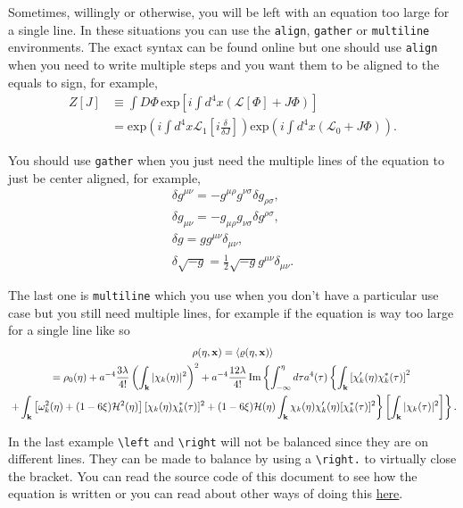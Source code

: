 Sometimes, willingly or otherwise, you will be left with an equation too large for a single line. In these situations you can use the \verb*|align|, \verb*|gather| or \verb*|multiline| environments. The exact syntax can be found online but one should use \verb*|align| when you need to write multiple steps and you want them to be aligned to the equals to sign, for example,
\begin{align}
	Z[J] &\equiv \int{D\Phi \, \text{exp}\left[i \int{d^4 x}(\mathscr{L}[\Phi]+J\Phi)\right]} \nonumber \\
	&= \text{exp}\left(i \int{d^4x}\mathscr{L}_1\left[i \frac{\delta}{\delta J}\right]\right) \text{exp}\left(i \int{d^4x }(\mathscr{L}_0 +J\Phi) \right) .\label{eq:Z}
\end{align}

You should use \verb*|gather| when you just need the multiple lines of the equation to just be center aligned, for example,
\begin{gather}
	\delta g^{\mu\nu} = - g^{\mu \rho}g^{\nu \sigma} \delta g_{\rho \sigma}, \\
	\delta g_{\mu\nu} = - g_{\mu \rho}g_{\nu \sigma} \delta g^{\rho \sigma}, \\
	\delta g  = g g^{\mu\nu} \delta_{\mu\nu}, \\
	\delta \sqrt{-g}  = \frac{1}{2}\sqrt{-g} g^{\mu\nu} \delta_{\mu\nu}. \label{eq:var-detg}
\end{gather}

The last one is \verb*|multiline| which you use when you don't have a particular use case but you still need multiple lines, for example if the equation is way too large for a single line like so
\begin{multline}
	\rho(\eta,\mathbf{x})=\left \langle \varrho(\eta,\mathbf{x}) \right \rangle \nonumber \\
	= \rho_0(\eta)+a^{-4}\frac{3\lambda}{4!}  \left( \int_{\mathbf{k}} |\chi_k(\eta)|^2\right)^2 +a^{-4}\frac{12\lambda}{4! } \operatorname{Im}
	\left\{ \int_{-\infty}^{\eta}{d\tau} a^4(\tau) \left\{  \int_{\mathbf{k}}\left[ \chi'_k(\eta) \chi^*_k(\tau) \right]^2 \right. \right. \nonumber \\
	\left. \left.+\int_{\mathbf{k}} \left[ \omega_k^2(\eta)+(1-6\xi)\mathcal{H}^2(\eta)\right] [\chi_k(\eta) \chi_k^*(\tau)]^2 +(1-6\xi)\mathcal{H}(\eta) \int_{\mathbf{k}}\chi_k(\eta)\chi'_k(\eta)  [\chi_k^*(\tau)]^2 \right\} \left[\int_\mathbf{k}|\chi_k(\tau)|^2\right] \right\}.\label{eq:interacting energy density}
\end{multline}



In the last example \lstinline|\left| and \lstinline|\right| will not be balanced since they are on different lines. They can be made to balance by using a \lstinline|\right.| to virtually close the bracket. You can read the source code of this document to see how the equation is written or you can read about other ways of doing this \href{https://tex.stackexchange.com/questions/21290/how-to-make-left-right-pairs-of-delimiter-work-over-multiple-lines}{here}.
